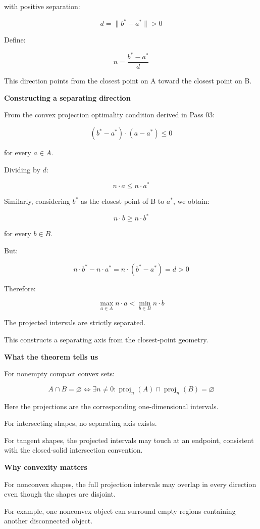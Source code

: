 with positive separation:

\[
d=\|b^*-a^*\|>0
\]

Define:

\[
\boxed{ n=\frac{b^*-a^*}{d} }
\]

This direction points from the closest point on A toward the closest point on B.

\textbf{Constructing a separating direction}

From the convex projection optimality condition derived in Pass 03:

\[
(b^*-a^*)\cdot(a-a^*)\le0
\]

for every \(a\in A\).

Dividing by \(d\):

\[
n\cdot a\le n\cdot a^*
\]

Similarly, considering \(b^*\) as the closest point of B to \(a^*\), we obtain:

\[
n\cdot b\ge n\cdot b^*
\]

for every \(b\in B\).

But:

\[
n\cdot b^*-n\cdot a^* = n\cdot(b^*-a^*)=d>0
\]

Therefore:

\[
\boxed{ \max_{a\in A}n\cdot a < \min_{b\in B}n\cdot b }
\]

The projected intervals are strictly separated.

This constructs a separating axis from the closest-point geometry.

\textbf{What the theorem tells us}

For nonempty compact convex sets:

\[
\boxed{ A\cap B=\varnothing \iff \exists n\ne0: \operatorname{proj}_n(A) \cap \operatorname{proj}_n(B)=\varnothing }
\]

Here the projections are the corresponding one-dimensional intervals.

For intersecting shapes, no separating axis exists.

For tangent shapes, the projected intervals may touch at an endpoint, consistent with the closed-solid intersection convention.

\textbf{Why convexity matters}

For nonconvex shapes, the full projection intervals may overlap in every direction even though the shapes are disjoint.

For example, one nonconvex object can surround empty regions containing another disconnected object.

